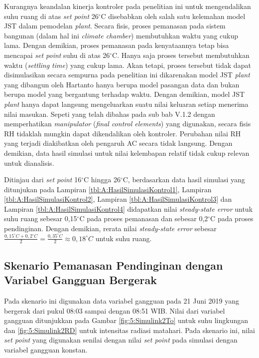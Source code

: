 Kurangnya keandalan kinerja kontroler pada penelitian ini untuk mengendalikan suhu ruang di atas \textit{set point} 26$^\circ$C disebabkan oleh salah satu kelemahan model JST dalam pemodelan \textit{plant}. Secara fisis, proses pemanasan pada sistem bangunan (dalam hal ini \textit{climate chamber}) membutuhkan waktu yang cukup lama. Dengan demikian, proses pemanasan pada kenyataannya tetap bisa mencapai \textit{set point} suhu di atas 26$^\circ$C. Hanya saja proses tersebut membutuhkan waktu (\textit{settling time}) yang cukup lama. Akan tetapi, proses tersebut tidak dapat disimulasikan secara sempurna pada penelitian ini dikarenakan model JST \textit{plant} yang dibangun oleh Hartanto\cite{skripsiTanto} hanya berupa model pasangan data dan bukan berupa model yang bergantung terhadap waktu. Dengan demikian, model JST \textit{plant} hanya dapat langsung mengeluarkan suatu nilai keluaran setiap menerima nilai masukan. Sepeti yang telah dibahas pada sub bab V.1.2 dengan memperhatikan \textit{manipulator} (\textit{final control elements}) yang digunakan, secara fisis RH tidaklah mungkin dapat dikendalikan oleh kontroler. Perubahan nilai RH yang terjadi diakibatkan oleh pengaruh AC secara tidak langsung. Dengan demikian, data hasil simulasi untuk nilai kelembapan relatif tidak cukup relevan untuk dianalisis.

Ditinjau dari \textit{set point} 16$^\circ$C hingga 26$^\circ$C, berdasarkan data hasil simulasi yang ditunjukan pada Lampiran \ref{tbl:A:HasilSimulasiKontrol1}, Lampiran \ref{tbl:A:HasilSimulasiKontrol2}, Lampiran \ref{tbl:A:HasilSimulasiKontrol3} dan Lampiran \ref{tbl:A:HasilSimulasiKontrol4} didapatkan nilai \textit{steady-state error} untuk suhu ruang sebesar 0,15$^\circ$C pada proses pemanasan dan sebesar 0,2$^\circ$C pada proses pendinginan. Dengan demikian, rerata nilai \textit{steady-state error} sebesar $\frac{0,15^\circ C + 0,2^\circ C}{2} = \frac{0,35^\circ C}{2} \approx 0,18^\circ C$ untuk suhu ruang.

\subsection{Skenario Pemanasan Pendinginan dengan Variabel Gangguan Bergerak}

Pada skenario ini digunakan data variabel gangguan pada 21 Juni 2019 yang bergerak dari pukul 08:03 sampai dengan 08:51 WIB. Nilai dari variabel gangguan ditunjukkan pada Gambar \ref{fig:5:Simulink2To} untuk suhu lingkungan dan \ref{fig:5:Simulink2RD} untuk intensitas radiasi matahari. Pada skenario ini, nilai \textit{set point} yang digunakan senilai dengan nilai \textit{set point} pada simulasi dengan variabel gangguan konstan.

